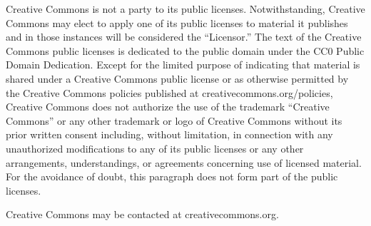 {Creative Commons is not a party to its public licenses. Notwithstanding, Creative Commons may elect to apply one of its public licenses to material it publishes and in those instances will be considered the “Licensor.” The text of the Creative Commons public licenses is dedicated to the public domain under the CC0 Public Domain Dedication. Except for the limited purpose of indicating that material is shared under a Creative Commons public license or as otherwise permitted by the Creative Commons policies published at creativecommons.org/policies, Creative Commons does not authorize the use of the trademark “Creative Commons” or any other trademark or logo of Creative Commons without its prior written consent including, without limitation, in connection with any unauthorized modifications to any of its public licenses or any other arrangements, understandings, or agreements concerning use of licensed material. For the avoidance of doubt, this paragraph does not form part of the public licenses.

Creative Commons may be contacted at creativecommons.org.

}
